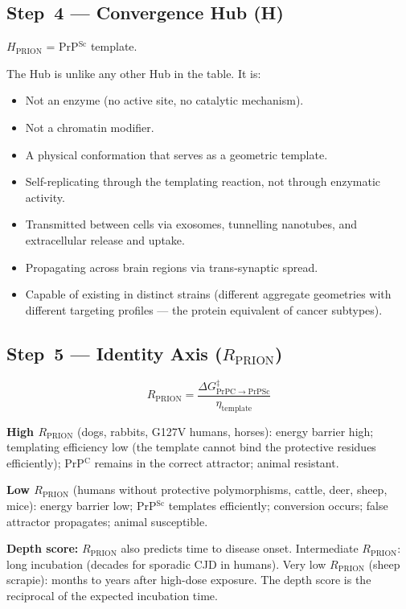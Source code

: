 \documentclass[12pt,a4paper]{article}
\newcommand{\rprion}{$R_{\mathrm{PRION}}$}
\newcommand{\prpc}{PrP$^{\mathrm{C}}$}
\newcommand{\prpsc}{PrP$^{\mathrm{Sc}}$}
\begin{document}
\subsection{Step~4 --- Convergence Hub (H)}

$H_{\mathrm{PRION}}$ = \prpsc{} template.

The Hub is unlike any other Hub in the table. It is:
\begin{itemize}
  \item Not an enzyme (no active site, no catalytic mechanism).
  \item Not a chromatin modifier.
  \item A physical conformation that serves as a geometric template.
  \item Self-replicating through the templating reaction, not through
    enzymatic activity.
  \item Transmitted between cells via exosomes, tunnelling nanotubes,
    and extracellular release and uptake.
  \item Propagating across brain regions via trans-synaptic spread.
  \item Capable of existing in distinct strains (different aggregate
    geometries with different targeting profiles --- the protein
    equivalent of cancer subtypes).
\end{itemize}

\subsection{Step~5 --- Identity Axis ($R_{\mathrm{PRION}}$)}

\begin{equation}
  R_{\mathrm{PRION}} = \frac{\Delta G^{\ddagger}_{\mathrm{PrPC \to PrPSc}}}
  {\eta_{\mathrm{template}}}
\end{equation}

\textbf{High \rprion{}} (dogs, rabbits, G127V humans, horses):
energy barrier high; templating efficiency low (the template cannot bind
the protective residues efficiently); \prpc{} remains in the correct
attractor; animal resistant.

\textbf{Low \rprion{}} (humans without protective polymorphisms, cattle,
deer, sheep, mice): energy barrier low; \prpsc{} templates efficiently;
conversion occurs; false attractor propagates; animal susceptible.

\textbf{Depth score:} \rprion{} also predicts time to disease onset.
Intermediate \rprion{}: long incubation (decades for sporadic CJD in
humans). Very low \rprion{} (sheep scrapie): months to years after
high-dose exposure. The depth score is the reciprocal of the expected
incubation time.
\end{document}
